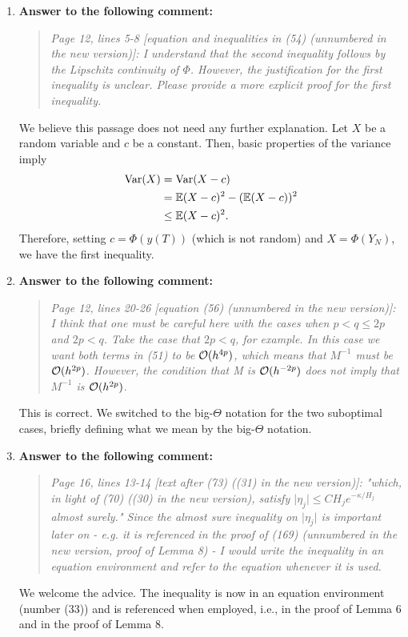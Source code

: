 \documentclass[10pt]{article}
\begin{document}
\begin{enumerate}
\item \textbf{Answer to the following comment:}
\begin{quote} \textit{Page 12, lines 5-8 [equation and inequalities in (54) (unnumbered in the new version)]: I understand that the second inequality follows by the Lipschitz continuity of $\Phi$. However, the justification for the first inequality is unclear. Please provide a more explicit proof for the first inequality.} \end{quote} 
We believe this passage does not need any further explanation. Let $X$ be a random variable and $c$ be a constant. Then, basic properties of the variance imply
\begin{equation*}
\begin{aligned}
	\mathrm{Var}(X) &= \mathrm{Var}(X - c)\\
	&= \operatorname{\mathbb{E}}(X - c)^2 - (\operatorname{\mathbb{E}}(X-c))^2\\
	&\leq \operatorname{\mathbb{E}}(X - c)^2.
\end{aligned}
\end{equation*}
Therefore, setting $c = \Phi(y(T))$ (which is not random) and $X = \Phi(Y_N)$, we have the first inequality.

\item \textbf{Answer to the following comment:}
\begin{quote} \textit{Page 12, lines 20-26 [equation (56) (unnumbered in the new version)]: I think that one must be careful here with the cases when $p<q\leq 2p$ and $2p<q$. Take the case that $2p<q$, for example. In this case we want both terms in (51) to be $\mathcal{O}(h^{4p})$, which means that $M^{-1}$ must be $\mathcal{O}(h^{2p})$. However, the condition that M is $\mathcal{O}(h^{-2p})$ does not imply that $M^{-1}$ is $\mathcal{O}(h^{2p})$.} \end{quote} 
This is correct. We switched to the big-$\Theta$ notation for the two suboptimal cases, briefly defining what we mean by the big-$\Theta$ notation. 

\item \textbf{Answer to the following comment:}
\begin{quote} \textit{Page 16, lines 13-14 [text after (73) ((31) in the new version)]: "which, in light of (70) ((30) in the new version), satisfy $\vert \eta_j\vert \leq CH_j e^{-\kappa/H_j}$ almost surely." Since the almost sure inequality on $\vert \eta_j\vert$ is important later on - e.g. it is referenced in the proof of (169) (unnumbered in the new version, proof of Lemma 8) - I would write the inequality in an equation environment and refer to the equation whenever it is used.} \end{quote} 
We welcome the advice. The inequality is now in an equation environment (number (33)) and is referenced when employed, i.e., in the proof of Lemma 6 and in the proof of Lemma 8.


\end{enumerate}
\end{document}
